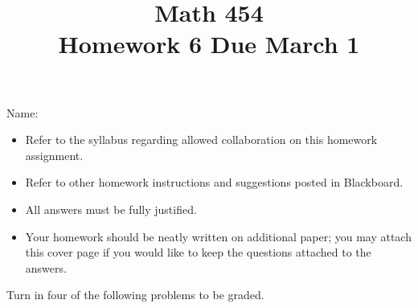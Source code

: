 \documentclass[11pt]{amsart}%
\begin{document}
\title{Math 454\\ Homework 6 %
\qquad Due March 1%
}
\author{}
\date{}
\maketitle
\thispagestyle{empty}

\noindent Name:~\hrulefill~~\\

\begin{itemize}
\item Refer to the syllabus regarding allowed collaboration on this homework assignment.
\item Refer to other homework instructions and suggestions posted in Blackboard.
\item All answers must be fully justified.
\item Your homework should be neatly written on additional paper; you may attach this cover page if you would like to keep the questions attached to the answers.
\end{itemize}

\bigskip
Turn in four of the following problems to be graded.
\bigskip
\end{document}

